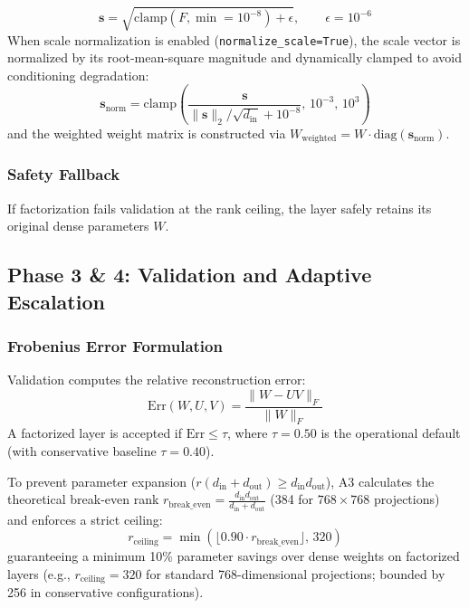 \[
\mathbf{s} = \sqrt{\mathrm{clamp}(F, \min=10^{-8}) + \epsilon}, \qquad \epsilon = 10^{-6}
\tag{4.8}
\]
When scale normalization is enabled (\texttt{normalize\_scale=True}), the scale vector is normalized by its root-mean-square magnitude and dynamically clamped to avoid conditioning degradation:
\begin{equation}
\mathbf{s}_{\mathrm{norm}} = \mathrm{clamp}\!\left(\frac{\mathbf{s}}{\|\mathbf{s}\|_2 / \sqrt{d_{\mathrm{in}}} + 10^{-8}},\, 10^{-3},\, 10^{3}\right)
\tag{4.9}
\end{equation}
and the weighted weight matrix is constructed via $W_{\mathrm{weighted}} = W \cdot \mathrm{diag}(\mathbf{s}_{\mathrm{norm}})$.

\subsubsection{Safety Fallback}

If factorization fails validation at the rank ceiling, the layer safely retains its original dense parameters $W$.

\subsection{Phase 3 \& 4: Validation and Adaptive Escalation}
\label{sec:frobenius_validation}

\subsubsection{Frobenius Error Formulation}

Validation computes the relative reconstruction error:
\begin{equation}
\mathrm{Err}(W, U, V) = \frac{\|W - U V\|_F}{\|W\|_F}
\tag{4.10}
\end{equation}
A factorized layer is accepted if $\mathrm{Err} \le \tau$, where $\tau = 0.50$ is the operational default (with conservative baseline $\tau = 0.40$).

To prevent parameter expansion ($r(d_{\mathrm{in}} + d_{\mathrm{out}}) \ge d_{\mathrm{in}} d_{\mathrm{out}}$), A3 calculates the theoretical break-even rank $r_{\mathrm{break\_even}} = \frac{d_{\mathrm{in}} d_{\mathrm{out}}}{d_{\mathrm{in}} + d_{\mathrm{out}}}$ (384 for $768 \times 768$ projections) and enforces a strict ceiling:
\begin{equation}
r_{\mathrm{ceiling}} = \min\!\left(\lfloor 0.90 \cdot r_{\mathrm{break\_even}} \rfloor,\, 320\right)
\tag{4.10a}
\end{equation}
guaranteeing a minimum 10\% parameter savings over dense weights on factorized layers (e.g., $r_{\mathrm{ceiling}} = 320$ for standard 768-dimensional projections; bounded by 256 in conservative configurations).

